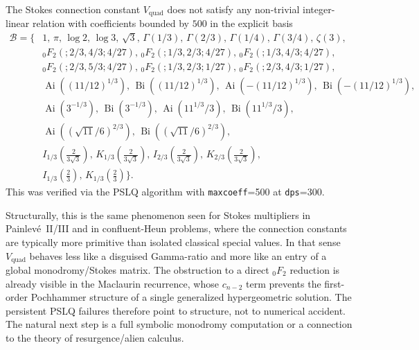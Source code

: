 \begin{theorem}\label{thm:vquad-exclusion}
The Stokes connection constant $V_{\mathrm{quad}}$ does not satisfy any non-trivial integer-linear relation with coefficients bounded by $500$ in the explicit basis
\[
\begin{aligned}
\mathcal{B}=\{&1,\,\pi,\,\log 2,\,\log 3,\,\sqrt{3},\,\Gamma(1/3),\,\Gamma(2/3),\,\Gamma(1/4),\,\Gamma(3/4),\,\zeta(3),\\
&{}_0F_2(;2/3,4/3;4/27),\,{}_0F_2(;1/3,2/3;4/27),\,{}_0F_2(;1/3,4/3;4/27),\\
&{}_0F_2(;2/3,5/3;4/27),\,{}_0F_2(;1/3,2/3;1/27),\,{}_0F_2(;2/3,4/3;1/27),\\
&\operatorname{Ai}\!\left((11/12)^{1/3}\right),\,\operatorname{Bi}\!\left((11/12)^{1/3}\right),\,\operatorname{Ai}\!\left(-(11/12)^{1/3}\right),\,\operatorname{Bi}\!\left(-(11/12)^{1/3}\right),\\
&\operatorname{Ai}(3^{-1/3}),\,\operatorname{Bi}(3^{-1/3}),\,\operatorname{Ai}(11^{1/3}/3),\,\operatorname{Bi}(11^{1/3}/3),\\
&\operatorname{Ai}\!\left((\sqrt{11}/6)^{2/3}\right),\,\operatorname{Bi}\!\left((\sqrt{11}/6)^{2/3}\right),\\
&I_{1/3}\!\left(\tfrac{2}{3\sqrt{3}}\right),\,K_{1/3}\!\left(\tfrac{2}{3\sqrt{3}}\right),\,I_{2/3}\!\left(\tfrac{2}{3\sqrt{3}}\right),\,K_{2/3}\!\left(\tfrac{2}{3\sqrt{3}}\right),\\
&I_{1/3}\!\left(\tfrac{2}{3}\right),\,K_{1/3}\!\left(\tfrac{2}{3}\right)\}.
\end{aligned}
\]
This was verified via the PSLQ algorithm with \texttt{maxcoeff}=500 at \texttt{dps}=300.
\end{theorem}

Structurally, this is the same phenomenon seen for Stokes multipliers in Painlev\'e~II/III and in confluent-Heun problems, where the connection constants are typically more primitive than isolated classical special values. In that sense $V_{\mathrm{quad}}$ behaves less like a disguised Gamma-ratio and more like an entry of a global monodromy/Stokes matrix. The obstruction to a direct ${}_0F_2$ reduction is already visible in the Maclaurin recurrence, whose $c_{n-2}$ term prevents the first-order Pochhammer structure of a single generalized hypergeometric solution. The persistent PSLQ failures therefore point to structure, not to numerical accident. The natural next step is a full symbolic monodromy computation or a connection to the theory of resurgence/alien calculus.
